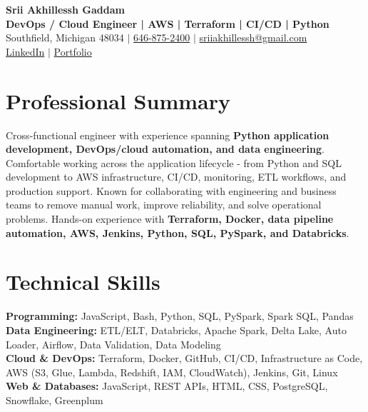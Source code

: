 \documentclass[letterpaper,10pt]{article}
\begin{document}
\fontsize{9.35pt}{10.45pt}\selectfont

\begin{center}
    {\LARGE \textbf{Srii Akhillessh Gaddam}} \\[-1pt]
    \textbf{DevOps / Cloud Engineer | AWS | Terraform | CI/CD | Python} \\[2pt]
    Southfield, Michigan 48034 $|$
    \href{tel:6468752400}{646-875-2400} $|$
    \href{mailto:sriiakhillessh@gmail.com}{sriiakhillessh@gmail.com} \\[1pt]
    \href{https://www.linkedin.com/in/srii-akhiilessh-gaddam-b48668191/}{LinkedIn} $|$
    \href{https://sriiakhillesshg.github.io/portfolio/}{Portfolio}
\end{center}
\vspace{-8pt}

\section{Professional Summary}
\small{Cross-functional engineer with experience spanning \textbf{Python application development, DevOps/cloud automation, and data engineering}. Comfortable working across the application lifecycle - from Python and SQL development to AWS infrastructure, CI/CD, monitoring, ETL workflows, and production support. Known for collaborating with engineering and business teams to remove manual work, improve reliability, and solve operational problems. Hands-on experience with \textbf{Terraform, Docker, data pipeline automation, AWS, Jenkins, Python, SQL, PySpark, and Databricks}.}

\section{Technical Skills}
\small{
\textbf{Programming:} JavaScript, Bash, Python, SQL, PySpark, Spark SQL, Pandas \\
\textbf{Data Engineering:} ETL/ELT, Databricks, Apache Spark, Delta Lake, Auto Loader, Airflow, Data Validation, Data Modeling \\
\textbf{Cloud \& DevOps:} Terraform, Docker, GitHub, CI/CD, Infrastructure as Code, AWS (S3, Glue, Lambda, Redshift, IAM, CloudWatch), Jenkins, Git, Linux \\
\textbf{Web \& Databases:} JavaScript, REST APIs, HTML, CSS, PostgreSQL, Snowflake, Greenplum
}
\end{document}
